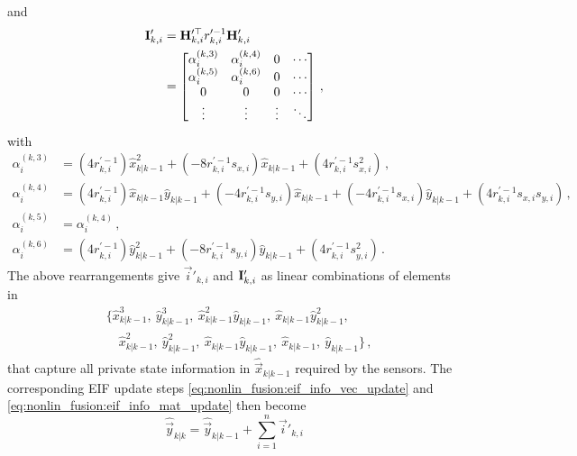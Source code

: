 and
\begin{equation}\label{eq:nonlin_fusion:hrh_linear_comb}
    \begin{split}
        {\ensuremath{{\mathbf{I}}}}'_{k,i} &= {{\mathbf{H}}}_{k,i}^{\prime\top} r_{k,i}^{\prime-1}{{\mathbf{H}}}'_{k,i} \\
        &=
        \begin{bmatrix}
            \alpha_i^{(k,3)} & \alpha_i^{(k,4)} & 0 & \cdots \\
            \alpha_i^{(k,5)} & \alpha_i^{(k,6)} & 0 & \cdots\\
            0 & 0 & 0 & \cdots \\
            \vdots & \vdots & \vdots & \ddots
        \end{bmatrix}\,,
    \end{split}
\end{equation}
with
\begin{align*}
    \alpha_i^{(k,3)} &= (4r_{k,i}^{\prime-1})\hat{x}_{k|k-1}^2 + (-8r_{k,i}^{\prime-1}s_{x,i})\hat{x}_{k|k-1} + (4r_{k,i}^{\prime-1}s_{x,i}^2)\,,\\
    \alpha_i^{(k,4)} &= (4r_{k,i}^{\prime-1})\hat{x}_{k|k-1}\hat{y}_{k|k-1} + (-4r_{k,i}^{\prime-1}s_{y,i})\hat{x}_{k|k-1} + (-4r_{k,i}^{\prime-1}s_{x,i})\hat{y}_{k|k-1} + (4r_{k,i}^{\prime-1}s_{x,i}s_{y,i})\,,\\
    \alpha_i^{(k,5)} &= \alpha_i^{(k,4)}\,,\\
    \alpha_i^{(k,6)} &= (4r_{k,i}^{\prime-1})\hat{y}_{k|k-1}^2 + (-8r_{k,i}^{\prime-1}s_{y,i})\hat{y}_{k|k-1} + (4r_{k,i}^{\prime-1}s_{y,i}^2)\,.
\end{align*}
The above rearrangements give $\vec{i}'_{k,i}$ and ${{\mathbf{I}}}'_{k,i}$ as linear combinations of elements in
\begin{equation}\label{eq:nonlin_fusion:weights_to_broadcast}
    \begin{split}
        &\{ \hat{x}_{k|k-1}^3,\ \hat{y}_{k|k-1}^3,\ \hat{x}_{k|k-1}^2\hat{y}_{k|k-1},\ \hat{x}_{k|k-1}\hat{y}_{k|k-1}^2,\\
        &\quad \hat{x}_{k|k-1}^2,\ \hat{y}_{k|k-1}^2,\ \hat{x}_{k|k-1}\hat{y}_{k|k-1},\ \hat{x}_{k|k-1},\ \hat{y}_{k|k-1}\}\,,
    \end{split}
\end{equation}
that capture all private state information in $\hat{\vec{x}}_{k|k-1}$ required by the sensors. The corresponding EIF update steps \eqref{eq:nonlin_fusion:eif_info_vec_update} and \eqref{eq:nonlin_fusion:eif_info_mat_update} then become
\begin{equation}\label{eq:nonlin_fusion:eif_modified_vec_update}
    \hat{\vec{y}}_{k|k} = \hat{\vec{y}}_{k|k-1} + \sum^n_{i=1}\vec{i}'_{k,i}
\end{equation}

